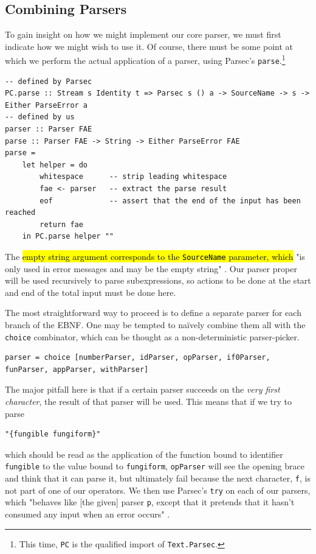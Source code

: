 \documentclass[format=acmlarge, review=false, nonacm=false, screen=true]{acmart}
\begin{document}
\subsection{Combining Parsers}
To gain insight on how we might implement our core parser, we must first indicate how we might wish to use it. Of course, there must be some point at which we perform the actual application of a parser, using Parsec's \texttt{parse}.\footnote{This time, \texttt{PC} is the qualified import of \texttt{Text.Parsec}.}

\begin{verbatim}
-- defined by Parsec
PC.parse :: Stream s Identity t => Parsec s () a -> SourceName -> s -> Either ParseError a
-- defined by us
parser :: Parser FAE
parse :: Parser FAE -> String -> Either ParseError FAE
parse =
    let helper = do
        whitespace      -- strip leading whitespace
        fae <- parser   -- extract the parse result
        eof             -- assert that the end of the input has been reached
        return fae
    in PC.parse helper ""
\end{verbatim}

The \hl{empty string argument corresponds to the \texttt{SourceName} parameter, which} "is only used in error messages and may be the empty string" \cite{parsec-hackage}. Our parser proper will be used recursively to parse subexpressions, so actions to be done at the start and end of the total input must be done here.

The most straightforward way to proceed is to define a separate parser for each branch of the EBNF. One may be tempted to naïvely combine them all with the \texttt{choice} combinator, which can be thought as a non-deterministic parser-picker.

\begin{verbatim}
parser = choice [numberParser, idParser, opParser, if0Parser, funParser, appParser, withParser]
\end{verbatim}

The major pitfall here is that if a certain parser succeeds on the \textit{very first character}, the result of that parser will be used. This means that if we try to parse
\begin{verbatim}
"{fungible fungiform}"
\end{verbatim}
which should be read as the application of the function bound to identifier \texttt{fungible} to the value bound to \texttt{fungiform}, \texttt{opParser} will see the opening brace and think that it can parse it, but ultimately fail because the next character, \texttt{f}, is not part of one of our operators. We then use Parsec's \texttt{try} on each of our parsers, which "behaves like [the given] parser \texttt{p}, except that it pretends that it hasn't consumed any input when an error occurs" \cite{parsec-hackage}.
\end{document}

